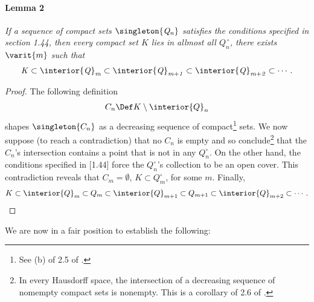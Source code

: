 \paragraph{Lemma 2}{ \it \label{1.16 Lemma 2}
If a sequence of compact sets $\mathit{\singleton{Q_n}}$ satisfies the conditions 
specified in section 1.44, then every compact set $K$ lies in allmost all 
%
  $\mathit{Q^{\,\circ}_n}$, \ie
%
there exists $\varit{m}$ such that 
%
  \begin{align}\mathit{
    K \subset 
    \interior{Q}_m 
      \subset 
    \interior{Q}_{m+1}
      \subset
    \interior{Q}_{m+2}
      \subset
    \cdots.}
  \end{align}
}
%
\begin{proof}
The following definition
%
  \begin{align}
    C_n \Def K \setminus \interior{Q}_n 
  \end{align}
%
shapes $\singleton{C_n}$ as a decreasing sequence of compact\footnote{
  See (b) of 2.5 of \cite{BigRudin}.
} 
sets. We now suppose (to reach a contradiction) that 
% 
  no $C_n$ is empty 
% 
and so conclude\footnote{
  In every Hausdorff space, the intersection of a decreasing sequence of %
  nomempty compact sets is nonempty. %
  This is a corollary of 2.6 of \cite{BigRudin}.
} 
that the $C_n$'s intersection contains a point that is not in any $Q^\circ_n$. 
On the other hand, the conditions specified in [1.44] force the 
% 
  $Q^\circ_n$'s collection  
%
to be an open cover.
% 
This contradiction reveals that 
%
  $C_m = \emptyset$, 
    \ie 
  $K \subset Q^\circ_m$, 
%  
for some $m$.
%
Finally,  
%
  \begin{align}
    K\subset 
    \interior{Q}_m
      \subset
    Q_m
      \subset
    \interior{Q}_{m+1}
      \subset
    Q_{m +1}
      \subset
    \interior{Q}_{m+2}
      \subset
    \cdots.
  \end{align}  
%
\end{proof}
\noindent We are now in a fair position to establish the following:
